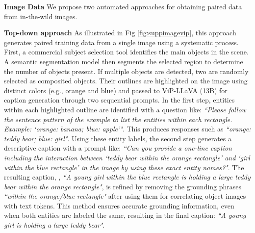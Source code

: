 



\noindent\textbf{Image Data} We propose two automated approaches for obtaining paired data from in-the-wild images. 

\textbf{Top-down approach} As illustrated in Fig \ref{fig:suppimagevip}, this approach generates paired training data from a single image using a systematic process. First, a commercial subject selection tool identifies the main objects in the scene. A semantic segmentation model \cite{qi2022entityseg} then segments the selected region to determine the number of objects present. If multiple objects are detected, two are randomly selected as composited objects. Their outlines are highlighted on the image using distinct colors (e.g., orange and blue) and passed to ViP-LLaVA (13B) \cite{cai2024vip} for caption generation through two sequential prompts. In the first step, entities within each highlighted outline are identified with a question like: \textit{``Please follow the sentence pattern of the example to list the entities within each rectangle. Example: `orange: banana; blue: apple'"}. This produces responses such as \textit{``orange: teddy bear; blue: girl"}. Using these entity labels, the second step generates a descriptive caption with a prompt like: \textit{``Can you provide a one-line caption including the interaction between `teddy bear within the orange rectangle' and `girl within the blue rectangle' in the image by using these exact entity names?"}. The resulting caption, \eg, \textit{``A young girl within the blue rectangle is holding a large teddy bear within the orange rectangle"}, is refined by removing the grounding phrases \textit{``within the orange/blue rectangle"} after using them for correlating object images with text tokens. This method ensures accurate grounding information, even when both entities are labeled the same, resulting in the final caption: \textit{``A young girl is holding a large teddy bear"}.

